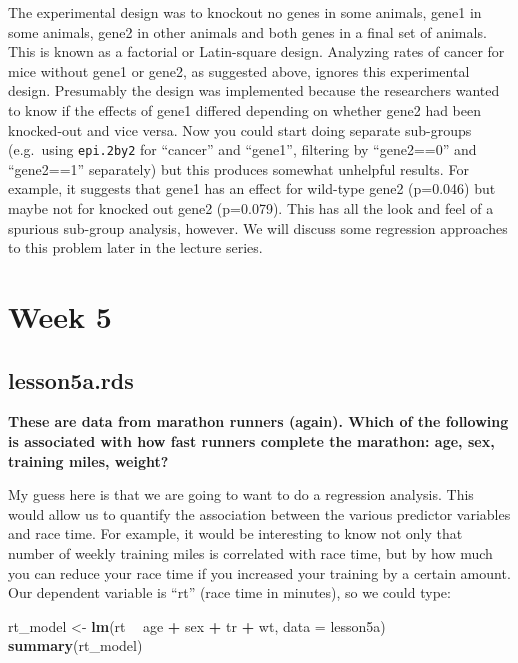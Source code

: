 \documentclass[]{book}
\newenvironment{Shaded}{\begin{snugshade}}{\end{snugshade}}
\newcommand{\DataTypeTok}[1]{\textcolor[rgb]{0.13,0.29,0.53}{#1}}
\newcommand{\KeywordTok}[1]{\textcolor[rgb]{0.13,0.29,0.53}{\textbf{#1}}}
\newcommand{\NormalTok}[1]{#1}
\newcommand{\OperatorTok}[1]{\textcolor[rgb]{0.81,0.36,0.00}{\textbf{#1}}}
\newcommand{\StringTok}[1]{\textcolor[rgb]{0.31,0.60,0.02}{#1}}
\begin{document}
The experimental design was to knockout no genes in some animals, gene1
in some animals, gene2 in other animals and both genes in a final set of
animals. This is known as a factorial or Latin-square design. Analyzing
rates of cancer for mice without gene1 or gene2, as suggested above,
ignores this experimental design. Presumably the design was implemented
because the researchers wanted to know if the effects of gene1 differed
depending on whether gene2 had been knocked-out and vice versa. Now you
could start doing separate sub-groups (e.g.~using \texttt{epi.2by2} for
``cancer'' and ``gene1'', filtering by ``gene2==0'' and ``gene2==1''
separately) but this produces somewhat unhelpful results. For example,
it suggests that gene1 has an effect for wild-type gene2 (p=0.046) but
maybe not for knocked out gene2 (p=0.079). This has all the look and
feel of a spurious sub-group analysis, however. We will discuss some
regression approaches to this problem later in the lecture series.

\hypertarget{week-5-1}{%
\section{Week 5}\label{week-5-1}}

\hypertarget{lesson5a.rds}{%
\subsection{lesson5a.rds}\label{lesson5a.rds}}

\textbf{These are data from marathon runners (again). Which of the
following is associated with how fast runners complete the marathon:
age, sex, training miles, weight?}

My guess here is that we are going to want to do a regression analysis.
This would allow us to quantify the association between the various
predictor variables and race time. For example, it would be interesting
to know not only that number of weekly training miles is correlated with
race time, but by how much you can reduce your race time if you
increased your training by a certain amount. Our dependent variable is
``rt'' (race time in minutes), so we could type:

\begin{Shaded}
\begin{Highlighting}[]
\NormalTok{rt_model <-}\StringTok{ }\KeywordTok{lm}\NormalTok{(rt }\OperatorTok{~}\StringTok{ }\NormalTok{age }\OperatorTok{+}\StringTok{ }\NormalTok{sex }\OperatorTok{+}\StringTok{ }\NormalTok{tr }\OperatorTok{+}\StringTok{ }\NormalTok{wt, }\DataTypeTok{data =}\NormalTok{ lesson5a)}
\KeywordTok{summary}\NormalTok{(rt_model)}
\end{Highlighting}
\end{Shaded}
\end{document}
